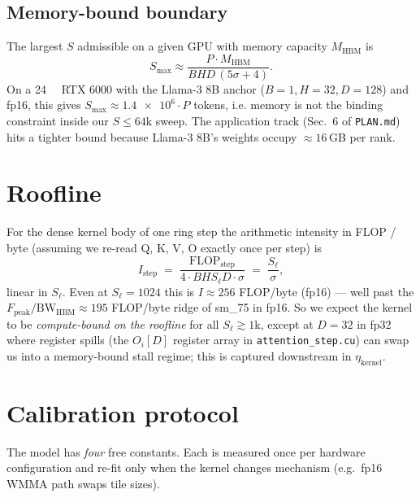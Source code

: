 \documentclass[11pt]{article}
\newcommand{\flops}{\mathrm{FLOP}}
\newcommand{\bw}{\mathrm{BW}}
\newcommand{\peak}{\mathrm{peak}}
\newcommand{\step}{\mathrm{step}}
\newcommand{\Bd}{\sigma}        %
\begin{document}
\subsection{Memory-bound boundary}

The largest $S$ admissible on a given GPU with memory capacity $M_{\text{HBM}}$
is
\begin{equation}
  S_{\max} \approx \frac{P \cdot M_{\text{HBM}}}
                        {B H D \,(5\Bd + 4)} .
  \label{eq:smax}
\end{equation}
On a \SI{24}{\giga\byte} RTX 6000 with the Llama-3 8B anchor
($B=1, H=32, D=128$) and fp16, this gives
$S_{\max} \approx \num{1.4e6}\cdot P$ tokens, i.e. memory is not
the binding constraint inside our $S \le 64$k sweep. The application
track (Sec.~6 of \texttt{PLAN.md}) hits a tighter bound because
Llama-3 8B's weights occupy $\approx 16$\,GB per rank.

\section{Roofline}
\label{sec:roofline}

For the dense kernel body of one ring step the arithmetic intensity
in FLOP / byte (assuming we re-read Q, K, V, O exactly once per step)
is
\begin{equation}
  I_\step \;=\;
  \frac{\flops_\step}{4 \cdot B H S_\ell D \cdot \Bd}
  \;=\; \frac{S_\ell}{\Bd} ,
  \label{eq:intensity}
\end{equation}
linear in $S_\ell$. Even at $S_\ell = 1024$ this is
$I \approx 256$ FLOP/byte (fp16) ---  well past the
$F_\peak/\bw_{\text{HBM}} \approx \num{195}$ FLOP/byte ridge of
sm\_75 in fp16. So we expect the kernel to be \emph{compute-bound on the
roofline} for all $S_\ell \gtrsim 1$k, except at $D = 32$ in fp32 where
register spills (the $O_i[D]$ register array in
\texttt{attention\_step.cu}) can swap us into a memory-bound stall regime;
this is captured downstream in $\eta_{\text{kernel}}$.

\section{Calibration protocol}
\label{sec:calibration}

The model has \emph{four} free constants. Each is measured once per
hardware configuration and re-fit only when the kernel changes
mechanism (e.g.~fp16 WMMA path swaps tile sizes).
\end{document}
